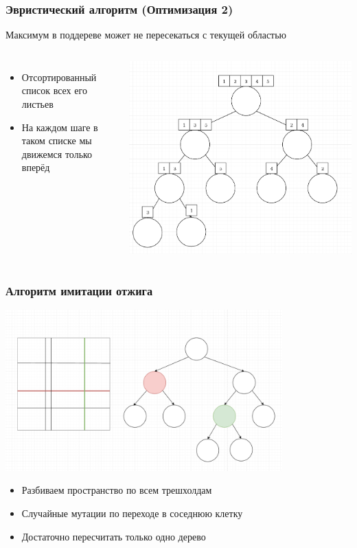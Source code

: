 \documentclass{beamer}
\begin{document}
\begin{frame} \frametitle{Эвристический алгоритм (Оптимизация 2)}
    Максимум в поддереве может не пересекаться с текущей областью

    \begin{columns}
            \begin{itemize}
                \item Отсортированный список всех его листьев
                \item На каждом шаге в таком списке мы движемся только вперёд
            \end{itemize}
            \includegraphics[width=1.1\textwidth]{merge.png}
    \end{columns}
\end{frame}

\begin{frame} \frametitle{Алгоритм имитации отжига}
    \begin{center}
    \includegraphics[width=0.8\textwidth]{gena.png}
    \end{center}
    \begin{itemize}
        \item Разбиваем пространство по всем трешхолдам
        \item Случайные мутации по переходе в соседнюю клетку
        \item Достаточно пересчитать только одно дерево
    \end{itemize}
\end{frame}
\end{document}
